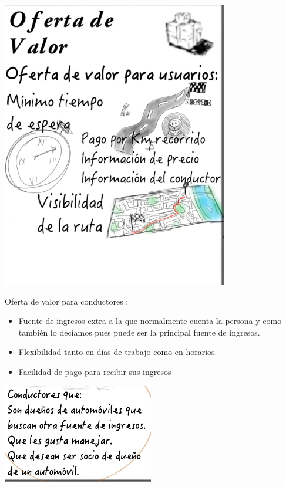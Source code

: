 \documentclass[10pt,a4paper]{article}
\begin{document}
\begin{multicols}{2}
\begin{enumerate}[a.]
				\begin{center}
					\includegraphics[scale=0.30]{./Imagenes/img03}
				\end{center}
			
			Oferta de valor para conductores :

				\begin{itemize}
					\item Fuente de ingresos extra a la que normalmente cuenta la persona y como también lo decíamos pues puede ser la principal fuente de ingresos. 
					\item Flexibilidad tanto en días de trabajo como en horarios.
					\item Facilidad de pago para recibir sus ingresos  
				\end{itemize}
				
				\begin{center}
					\includegraphics[scale=0.55]{./Imagenes/img04}
				\end{center}
			

\end{enumerate}
\end{multicols}
\end{document}
